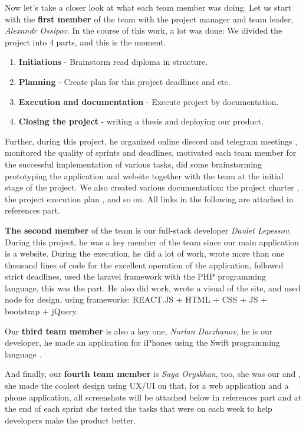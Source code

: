 Now let's take a closer look at what each team member was doing. Let us start with the \textbf{first member} of the team with the project manager and team leader, \textit{Alexandr Ossipov}. In the course of this work, a lot was done: We divided the project into 4 parts, and this is the moment.

\begin{enumerate}
    \item \textbf{Initiations} - Brainstorm read diploma in structure. 
    \item \textbf{Planning} - Create plan for this project deadlines and etc. 
    \item \textbf{Execution and documentation} - Execute project by documentation. 
    \item \textbf{Closing the project} - writing a thesis and deploying our product.
\end{enumerate}

 Further, during this project, he organized online discord \cite{discord} and telegram meetings \cite{telegram}, monitored the quality of sprints and deadlines, motivated each team member for the successful implementation of various tasks, did some brainstorming prototyping the application and website together with the team at the initial stage of the project. We also created various documentation: the project charter \cite{projectcharter}, the project execution plan \cite{executionplan}, and so on. All links in the following are attached in references part. 
\vspace{0.5cm}
\par
\textbf{The second member} of the team is our full-stack developer \textit{Daulet Lepessov}. During this project, he was a key member of the team since our main application is a website. During the execution, he did a lot of work, wrote more than one thousand lines of code for the excellent operation of the application, followed strict deadlines, used the laravel \cite{laravel} framework with the PHP programming language, this was the  part. He also did  work, wrote a visual of the site, and used node for design, using frameworks: REACT.JS \cite{react} + HTML + CSS + JS\cite{htmlcssjs} + bootstrap\cite{boostrap} + jQuery\cite{jquery}.
\vspace{0.5cm}
\par
Our \textbf{third team member} is also a key one, \textit{Nurlan Darzhanov}, he is our  developer, he made an application for iPhones using the Swift programming language \cite{swift}. 
\vspace{0.5cm}
\par
And finally, our \textbf{fourth team member} is \textit{Saya Oryskhan}, too, she was our  and , she made the coolest design using UX/UI \cite{design} on that, for a web application and a phone application, all screenshots will be attached below in references part and at the end of each sprint she tested the tasks that were on each week to help developers make the product better.